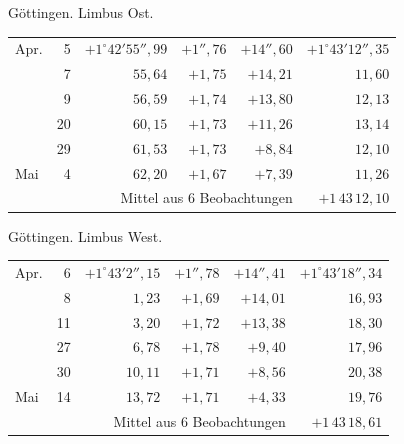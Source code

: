 \noindent\begin{minipage}[t]{.495\textwidth}\centering Göttingen. Limbus Ost.\par\smallskip
{\scriptsize\setlength{\tabcolsep}{1pt}\renewcommand{\arraystretch}{1.2}\begin{tabular}{lr|r|r|r|r|}
Apr.&5&$+1^\circ42'55''{,}99$&$+1''{,}76$&$+14''{,}60$&$+1^\circ43'12''{,}35$\\
&7&$55{,}64$&$+1{,}75$&$+14{,}21$&$11{,}60$\\
&9&$56{,}59$&$+1{,}74$&$+13{,}80$&$12{,}13$\\
&20&$60{,}15$&$+1{,}73$&$+11{,}26$&$13{,}14$\\
&29&$61{,}53$&$+1{,}73$&$+8{,}84$&$12{,}10$\\
Mai&4&$62{,}20$&$+1{,}67$&$+7{,}39$&$11{,}26$\\
\cline{6-6}\multicolumn{5}{r}{Mittel aus 6 Beobachtungen}&$+1\,43\,12{,}10$
\end{tabular}}\end{minipage}\hfill\begin{minipage}[t]{.495\textwidth}\centering Göttingen. Limbus West.\par\smallskip
{\scriptsize\setlength{\tabcolsep}{1pt}\renewcommand{\arraystretch}{1.2}\begin{tabular}{lr|r|r|r|r}
Apr.&6&$+1^\circ43'2''{,}15$&$+1''{,}78$&$+14''{,}41$&$+1^\circ43'18''{,}34$\\
&8&$1{,}23$&$+1{,}69$&$+14{,}01$&$16{,}93$\\
&11&$3{,}20$&$+1{,}72$&$+13{,}38$&$18{,}30$\\
&27&$6{,}78$&$+1{,}78$&$+9{,}40$&$17{,}96$\\
&30&$10{,}11$&$+1{,}71$&$+8{,}56$&$20{,}38$\\
Mai&14&$13{,}72$&$+1{,}71$&$+4{,}33$&$19{,}76$\\
\cline{6-6}\multicolumn{5}{r}{Mittel aus 6 Beobachtungen}&$+1\,43\,18{,}61$
\end{tabular}}\end{minipage}
\par\vspace{4mm}

